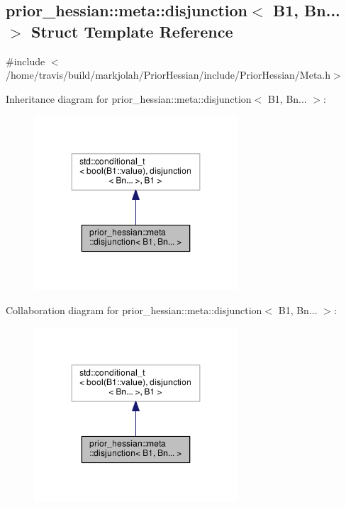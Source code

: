 \hypertarget{structprior__hessian_1_1meta_1_1disjunction_3_01B1_00_01Bn_8_8_8_01_4}{}\subsection{prior\+\_\+hessian\+:\+:meta\+:\+:disjunction$<$ B1, Bn... $>$ Struct Template Reference}
\label{structprior__hessian_1_1meta_1_1disjunction_3_01B1_00_01Bn_8_8_8_01_4}


{\ttfamily \#include $<$/home/travis/build/markjolah/\+Prior\+Hessian/include/\+Prior\+Hessian/\+Meta.\+h$>$}



Inheritance diagram for prior\+\_\+hessian\+:\+:meta\+:\+:disjunction$<$ B1, Bn... $>$\+:\nopagebreak
\begin{figure}[H]
\begin{center}
\leavevmode
\includegraphics[width=215pt]{structprior__hessian_1_1meta_1_1disjunction_3_01B1_00_01Bn_8_8_8_01_4__inherit__graph}
\end{center}
\end{figure}


Collaboration diagram for prior\+\_\+hessian\+:\+:meta\+:\+:disjunction$<$ B1, Bn... $>$\+:\nopagebreak
\begin{figure}[H]
\begin{center}
\leavevmode
\includegraphics[width=215pt]{structprior__hessian_1_1meta_1_1disjunction_3_01B1_00_01Bn_8_8_8_01_4__coll__graph}
\end{center}
\end{figure}


